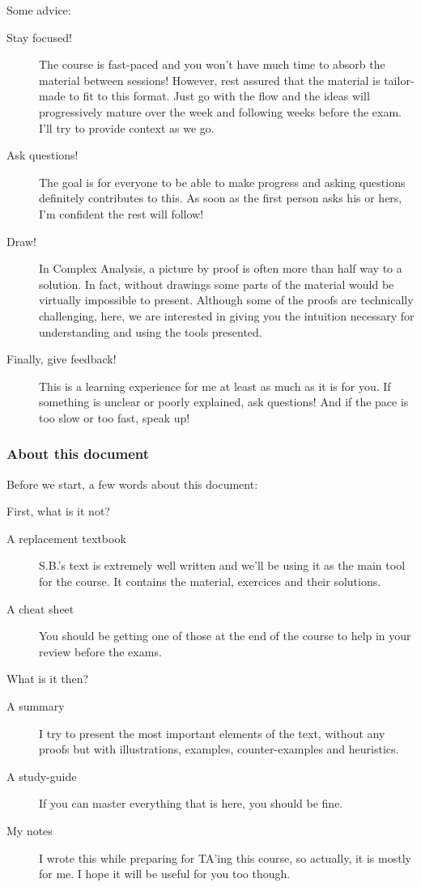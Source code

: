 Some advice:
\begin{description}
    \item[Stay focused!] The course is fast-paced and you won't have much time to absorb the material between sessions! However, rest assured that the material is tailor-made to fit to this format. Just go with the flow and the ideas will progressively mature over the week and following weeks before the exam. I'll try to provide context as we go. 
    \item [Ask questions!] The goal is for everyone to be able to make progress and asking questions definitely contributes to this. As soon as the first person asks his or hers, I'm confident the rest will follow!
    \item [Draw!] In Complex Analysis, a picture by proof is often more than half way to a solution. In fact, without drawings some parts of the material would be virtually impossible to present.  Although some of the proofs are technically challenging, here, we are interested in giving you the intuition necessary for understanding and using the tools presented.
    \item [Finally, give feedback!] This is a learning experience for me at least as much as it is for you. If something is unclear or poorly explained, ask questions! And if the pace is too slow or too fast, speak up!
\end{description}

\subsubsection*{About this document}
Before we start, a few words about this document:

First, what is it not?
\begin{description}
    \item [A replacement textbook] S.B.'s text is extremely well written and we'll be using it as the main tool for the course. It contains the material, exercices and their solutions.
    \item [A cheat sheet] You should be getting one of those at the end of the course to help in your review before the exams.
\end{description}
What is it then?
\begin{description}
    \item [A summary] I try to present the most important elements of the text, without any proofs but with illustrations, examples, counter-examples and heuristics.
    \item [A study-guide] If you can master everything that is here, you should be fine.
    \item [My notes] I wrote this while preparing for TA'ing this course, so actually, it is mostly for me. I hope it will be useful for you too though.
\end{description}

